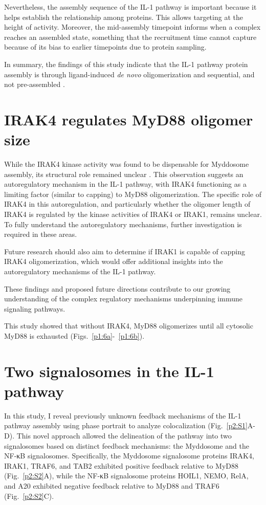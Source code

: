 Nevertheless, the assembly sequence of the IL-1 pathway is important because it helps establish the relationship among proteins. This allows targeting at the height of activity. Moreover, the mid-assembly timepoint informs when a complex reaches an assembled state, something that the recruitment time cannot capture because of its bias to earlier timepoints due to protein sampling.

In summary, the findings of this study indicate that the IL-1 pathway protein assembly is through ligand-induced \emph{de novo} oligomerization and sequential, and not pre-assembled \autocite{Moncrieffe_2020}.

\section{IRAK4 regulates MyD88 oligomer size}
While the IRAK4 kinase activity was found to be dispensable for Myddosome assembly, its structural role remained unclear \autocite{DeNardo_2018}. This observation suggests an autoregulatory mechanism in the IL-1 pathway, with IRAK4 functioning as a limiting factor (similar to capping) to MyD88 oligomerization. The specific role of IRAK4 in this autoregulation, and particularly whether the oligomer length of IRAK4 is regulated by the kinase activities of IRAK4 or IRAK1, remains unclear. To fully understand the autoregulatory mechanisms, further investigation is required in these areas.

Future research should also aim to determine if IRAK1 is capable of capping IRAK4 oligomerization, which would offer additional insights into the autoregulatory mechanisms of the IL-1 pathway.

These findings and proposed future directions contribute to our growing understanding of the complex regulatory mechanisms underpinning immune signaling pathways.

This study showed that without IRAK4, MyD88 oligomerizes until all cytosolic MyD88 is exhausted (Figs.~\ref{p1:6a}-~\ref{p1:6b}). 
\section{Two signalosomes in the IL-1 pathway}
In this study, I reveal previously unknown feedback mechanisms of the IL-1 pathway assembly using phase portrait to analyze colocalization (Fig.~\ref{p2:S1}A-D). This novel approach allowed the delineation of the pathway into two signalosomes based on distinct feedback mechanisms: the Myddosome and the NF-κB signalosomes. Specifically, the Myddosome signalosome proteins IRAK4, IRAK1, TRAF6, and TAB2 exhibited positive feedback relative to MyD88 (Fig.~\ref{p2:S2}A), while the NF-κB signalosome proteins HOIL1, NEMO, RelA, and A20 exhibited negative feedback relative to MyD88 and TRAF6 (Fig.~\ref{p2:S2}C).

